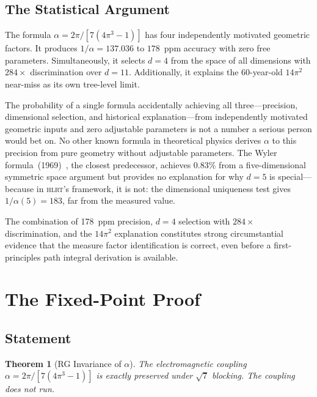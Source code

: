 \documentclass[12pt,a4paper]{article}
\theoremstyle{plain}
\newtheorem{theorem}{Theorem}[section]
\theoremstyle{definition}
\newcommand{\HLRT}{\textsc{hlrt}}
\begin{document}
\subsection{The Statistical Argument}

The formula $\alpha = 2\pi/[7(4\pi^3 - 1)]$ has four independently motivated geometric factors. It produces $1/\alpha = 137.036$ to $178$~ppm accuracy with zero free parameters. Simultaneously, it selects $d = 4$ from the space of all dimensions with $284\times$ discrimination over $d = 11$. Additionally, it explains the 60-year-old $14\pi^2$ near-miss as its own tree-level limit.

The probability of a single formula accidentally achieving all three---precision, dimensional selection, and historical explanation---from independently motivated geometric inputs and zero adjustable parameters is not a number a serious person would bet on. No other known formula in theoretical physics derives $\alpha$ to this precision from pure geometry without adjustable parameters. The Wyler formula~(1969)~\cite{Wyler1969}, the closest predecessor, achieves $0.83\%$ from a five-dimensional symmetric space argument but provides no explanation for why $d = 5$ is special---because in \HLRT{}'s framework, it is not: the dimensional uniqueness test gives $1/\alpha(5) = 183$, far from the measured value.

The combination of 178~ppm precision, $d = 4$ selection with $284\times$ discrimination, and the $14\pi^2$ explanation constitutes strong circumstantial evidence that the measure factor identification is correct, even before a first-principles path integral derivation is available.

\section{The Fixed-Point Proof}\label{sec:fixed}

\subsection{Statement}

\begin{theorem}[RG Invariance of $\alpha$]\label{thm:fixed-point}
The electromagnetic coupling $\alpha = 2\pi/[7(4\pi^3 - 1)]$ is exactly preserved under $\sqrt{7}$ blocking. The coupling does not run.
\end{theorem}
\end{document}
